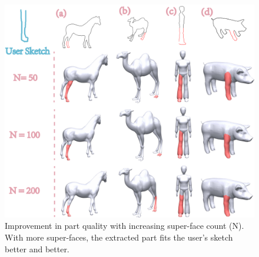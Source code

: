 \begin{figure}[h!] \centering
\includegraphics[width=1.0\linewidth]{./Material/SFGNVary.pdf}
\caption{Improvement in part quality with increasing super-face count (N). With more super-faces, the extracted part fits the user's sketch better and better.}
\label{fig:SFCountsPartQuality}
\end{figure}

